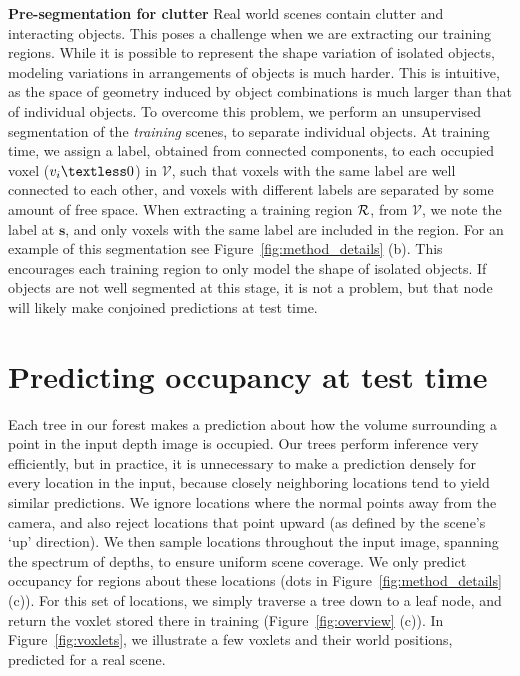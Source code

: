 \documentclass[10pt,twocolumn,letterpaper]{article}
\newcommand{\pixelidx}{\mathbf{s}}
\newcommand{\voxelgrid}{\mathcal{V}}
\newcommand{\voxel}{v}
\renewcommand{\paragraph}{\vspace{2pt}\noindent\textbf}
\begin{document}
\paragraph{Pre-segmentation for clutter}\newline
Real world scenes contain clutter and interacting objects.
This poses a challenge when we are extracting our training regions.
While it is possible to represent the shape variation of isolated objects, modeling variations in arrangements of objects is much harder.
This is intuitive, as the space of geometry induced by object combinations is much larger than that of individual objects.
To overcome this problem, we perform an unsupervised segmentation of the \emph{training} scenes, to separate individual objects.
At training time, we assign a label, obtained from connected components, to each occupied voxel ($\voxel_i \textless 0$) in $\voxelgrid$, such that voxels with the same label are well connected to each other, and voxels with different labels are separated by some amount of free space.
When extracting a training region $\mathcal{R}$, from $\voxelgrid$, we note the label at $\pixelidx$, and only voxels with the same label are included in the region.
For an example of this segmentation see Figure~\ref{fig:method_details} (b).
This encourages each training region to only model the shape of isolated objects.
If objects are not well segmented at this stage, it is not a problem, but that node will likely make conjoined predictions at test time.

\section{Predicting occupancy at test time}
Each tree in our forest makes a prediction about how the volume surrounding a point in the input depth image is occupied. Our trees perform inference very efficiently, but in practice, it is unnecessary to make a prediction densely for every location in the input, because closely neighboring locations tend to yield similar predictions.
We ignore locations where the normal points away from the camera, and also reject locations that point upward (as defined by the scene's `up' direction).
We then sample locations throughout the input image, spanning the spectrum of depths, to ensure uniform scene coverage. We only predict occupancy for regions about these locations (dots in Figure~\ref{fig:method_details} (c)).
For this set of locations, we simply traverse a tree down to a leaf node, and return the voxlet stored there in training (Figure~\ref{fig:overview} (c)).
In Figure~\ref{fig:voxlets}, we illustrate a few voxlets and their world positions, predicted for a real scene.
\end{document}
